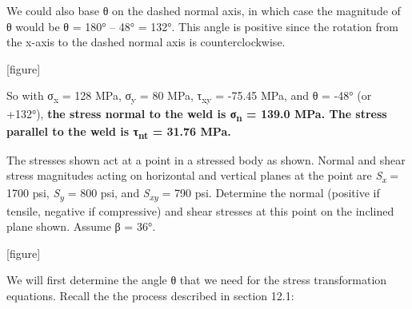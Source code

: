 \documentclass[
  letterpaper,
  DIV=11,
  numbers=noendperiod]{scrreprt}
\begin{document}
\begin{tcolorbox}
\begin{tcolorbox}
We could also base θ on the dashed normal axis, in which case the
magnitude of θ would be θ = 180° -- 48° = 132°. This angle is positive
since the rotation from the x-axis to the dashed normal axis is
counterclockwise.

{[}figure{]}

So with σ\textsubscript{x} = 128 MPa, σ\textsubscript{y} = 80 MPa,
τ\textsubscript{xy} = -75.45 MPa, and θ = -48° (or +132°), \textbf{the
stress normal to the weld is σ\textsubscript{n} = 139.0 MPa. The stress
parallel to the weld is τ\textsubscript{nt} = 31.76 MPa.}

\end{tcolorbox}

\end{tcolorbox}

\begin{tcolorbox}[enhanced jigsaw, breakable, opacityback=0, toptitle=1mm, left=2mm, colback=white, opacitybacktitle=0.6, colframe=quarto-callout-note-color-frame, titlerule=0mm, arc=.35mm, leftrule=.75mm, bottomtitle=1mm, colbacktitle=quarto-callout-note-color!10!white, rightrule=.15mm, title={Example 12.2:}, bottomrule=.15mm, toprule=.15mm, coltitle=black]

The stresses shown act at a point in a stressed body as shown. Normal
and shear stress magnitudes acting on horizontal and vertical planes at
the point are \emph{S\textsubscript{x}} = 1700 psi,
\emph{S\textsubscript{y}} = 800 psi, and \emph{S\textsubscript{xy}} =
790 psi. Determine the normal (positive if tensile, negative if
compressive) and shear stresses at this point on the inclined plane
shown. Assume β = 36°.

{[}figure{]}

\begin{tcolorbox}[enhanced jigsaw, breakable, opacityback=0, toptitle=1mm, left=2mm, colback=white, opacitybacktitle=0.6, colframe=quarto-callout-note-color-frame, titlerule=0mm, arc=.35mm, leftrule=.75mm, bottomtitle=1mm, colbacktitle=quarto-callout-note-color!10!white, rightrule=.15mm, title={Solution}, bottomrule=.15mm, toprule=.15mm, coltitle=black]

We will first determine the angle θ that we need for the stress
transformation equations. Recall the the process described in section
12.1:


\end{tcolorbox}
\end{tcolorbox}
\end{document}
